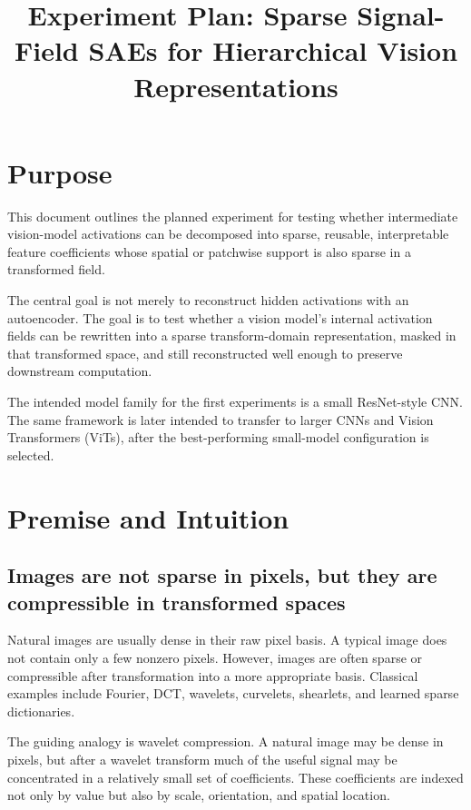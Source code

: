 \documentclass[11pt]{article}
\title{Experiment Plan: Sparse Signal-Field SAEs for Hierarchical Vision Representations}
\author{}
\date{}
\begin{document}
\maketitle

\section{Purpose}

This document outlines the planned experiment for testing whether intermediate vision-model activations can be decomposed into sparse, reusable, interpretable feature coefficients whose spatial or patchwise support is also sparse in a transformed field.

The central goal is not merely to reconstruct hidden activations with an autoencoder. The goal is to test whether a vision model's internal activation fields can be rewritten into a sparse transform-domain representation, masked in that transformed space, and still reconstructed well enough to preserve downstream computation.

The intended model family for the first experiments is a small ResNet-style CNN. The same framework is later intended to transfer to larger CNNs and Vision Transformers (ViTs), after the best-performing small-model configuration is selected.

\section{Premise and Intuition}

\subsection{Images are not sparse in pixels, but they are compressible in transformed spaces}

Natural images are usually dense in their raw pixel basis. A typical image does not contain only a few nonzero pixels. However, images are often sparse or compressible after transformation into a more appropriate basis. Classical examples include Fourier, DCT, wavelets, curvelets, shearlets, and learned sparse dictionaries.

The guiding analogy is wavelet compression. A natural image may be dense in pixels, but after a wavelet transform much of the useful signal may be concentrated in a relatively small set of coefficients. These coefficients are indexed not only by value but also by scale, orientation, and spatial location.
\end{document}
